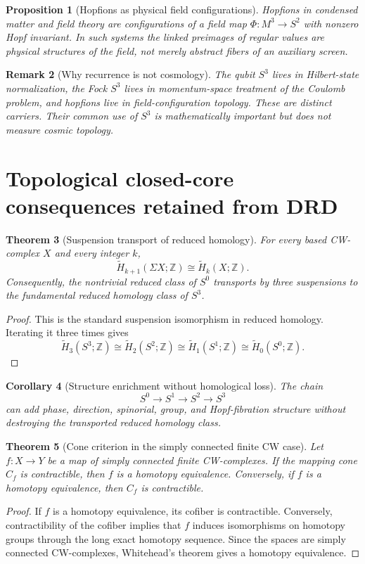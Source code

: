 \documentclass[11pt,a4paper]{article}
\newtheorem{theorem}{Theorem}[section]
\newtheorem{proposition}[theorem]{Proposition}
\newtheorem{corollary}[theorem]{Corollary}
\newtheorem{remark}[theorem]{Remark}
\begin{document}
\begin{proposition}[Hopfions as physical field configurations]
Hopfions in condensed matter and field theory are configurations of a field map $\Phi:M^3\to S^2$ with nonzero Hopf invariant.  In such systems the linked preimages of regular values are physical structures of the field, not merely abstract fibers of an auxiliary screen.
\end{proposition}

\begin{remark}[Why recurrence is not cosmology]
The qubit $S^3$ lives in Hilbert-state normalization, the Fock $S^3$ lives in momentum-space treatment of the Coulomb problem, and hopfions live in field-configuration topology.  These are distinct carriers.  Their common use of $S^3$ is mathematically important but does not measure cosmic topology.
\end{remark}

\section{Topological closed-core consequences retained from DRD}

\begin{theorem}[Suspension transport of reduced homology]
For every based CW-complex $X$ and every integer $k$,
\[
\widetilde H_{k+1}(\Sigma X;\mathbb Z)\cong \widetilde H_k(X;\mathbb Z).
\]
Consequently, the nontrivial reduced class of $S^0$ transports by three suspensions to the fundamental reduced homology class of $S^3$.
\end{theorem}
\begin{proof}
This is the standard suspension isomorphism in reduced homology.  Iterating it three times gives
\[
\widetilde H_3(S^3;\mathbb Z)
\cong
\widetilde H_2(S^2;\mathbb Z)
\cong
\widetilde H_1(S^1;\mathbb Z)
\cong
\widetilde H_0(S^0;\mathbb Z).
\]
\end{proof}

\begin{corollary}[Structure enrichment without homological loss]
The chain
\[
S^0\longrightarrow S^1\longrightarrow S^2\longrightarrow S^3
\]
can add phase, direction, spinorial, group, and Hopf-fibration structure without destroying the transported reduced homology class.
\end{corollary}

\begin{theorem}[Cone criterion in the simply connected finite CW case]
Let $f:X\to Y$ be a map of simply connected finite CW-complexes.  If the mapping cone $C_f$ is contractible, then $f$ is a homotopy equivalence.  Conversely, if $f$ is a homotopy equivalence, then $C_f$ is contractible.
\end{theorem}
\begin{proof}
If $f$ is a homotopy equivalence, its cofiber is contractible.  Conversely, contractibility of the cofiber implies that $f$ induces isomorphisms on homotopy groups through the long exact homotopy sequence.  Since the spaces are simply connected CW-complexes, Whitehead's theorem gives a homotopy equivalence.
\end{proof}
\end{document}
